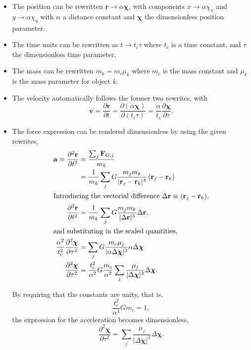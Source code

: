 \documentclass[a4paper,11pt]{article}
\begin{document}
\begin{itemize}
    \item The position can be rewritten $\mathbf{r} \to \alpha \boldsymbol{\chi}$, with components $x \to \alpha \chi_x$ and $y \to \alpha \chi_y$ with $\alpha$ a distance constant and $\boldsymbol{\chi}$ the dimensionless position parameter.

    \item The time units can be rewritten as $t \to t_c \tau$ where $t_c$ is a time constant, and $\tau$ the dimensionless time parameter.

    \item The mass can be rewritten $m_k = m_c \mu_k$ where $m_c$ is the mass constant and $\mu_k$ is the mass parameter for object $k$.

    \item The velocity automatically follows the former two rewrites, with 
\[ \mathbf{v} = \frac{\partial \mathbf{r}}{\partial t} = \frac{\partial (\alpha \boldsymbol{\chi})}{\partial (t_c \tau)} = \frac{\alpha}{t_c} \frac{\partial \boldsymbol{\chi}}{\partial \tau}. \]

\item The force expression can be rendered dimensionless by using the given rewrites,
\begin{align*}
    \mathbf{a} = \frac{\partial^2 \mathbf{r}}{\partial t^2} &= \frac{\sum_j \mathbf{F}_{G,j}}{m_k} \\
    &= \frac{1}{m_k} \sum_j G \frac{m_j m_k}{| \mathbf{r}_j - \mathbf{r}_k |^3} \left( \mathbf{r}_j - \mathbf{r}_k \right) \\
    \intertext{Introducing the vectorial difference $\Delta \mathbf{r} \equiv \left( \mathbf{r}_j - \mathbf{r}_k \right)$,}
         \frac{\partial^2 \mathbf{r}}{\partial t^2} &= \frac{1}{m_k} \sum_j G \frac{m_j m_k}{| \Delta \mathbf{r} |^3} \Delta \mathbf{r}, \\
         \intertext{and substituting in the scaled quantities,}
    \frac{\alpha^2}{t_c^2} \frac{\partial^2 \boldsymbol{\chi}}{\partial \tau^2} &= \sum_j G \frac{m_c \mu_j}{|\alpha \Delta \boldsymbol{\chi}|^3} \alpha \Delta \boldsymbol{\chi} \\
    \frac{\partial^2 \boldsymbol{\chi}}{\partial \tau^2} &= \frac{t_c^2}{\alpha^2} G \frac{m_c}{\alpha^2} \sum_j \frac{\mu_j}{|\Delta \boldsymbol{\chi} |^3} \Delta \boldsymbol{\chi}. 
\end{align*}

By requiring that the constants are unity, that is,
\[    \frac{t_c^2}{\alpha^4} G m_c = 1, \]
the expression for the acceleration becomes dimensionless,
\begin{equation}
\frac{\partial^2 \boldsymbol{\chi}}{\partial \tau^2} = \sum_j \frac{\mu_j}{|\Delta \boldsymbol{\chi}|^3} \Delta \boldsymbol{\chi}.
    \label{eq:dimless}
\end{equation}
\end{itemize}
\end{document}
